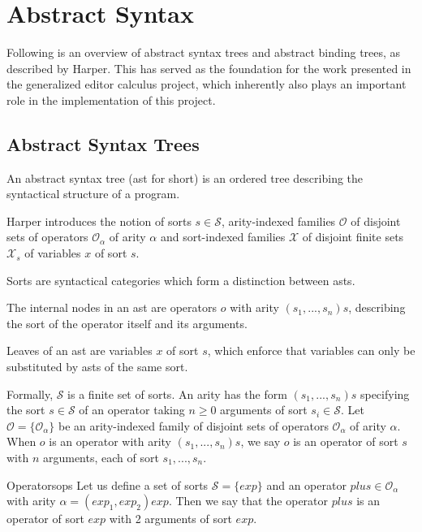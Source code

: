 \section{Abstract Syntax}
Following is an overview of abstract syntax trees and abstract binding trees, as described by Harper\cite{harper}. This has served as the foundation for the work presented in
the generalized editor calculus project\cite{aalborg}, which inherently 
also plays an important role in the implementation of this project.


\subsection{Abstract Syntax Trees}
An abstract syntax tree (ast for short) is an ordered tree describing the syntactical structure of a program.

Harper introduces the notion of sorts $s \in \mathcal{S}$, arity-indexed families $\mathcal{O}$ of disjoint sets of operators $\mathcal{O}_\alpha$ of arity $\alpha$ and sort-indexed families $\mathcal{X}$ of disjoint finite sets $\mathcal{X}_s$ of variables $x$ of sort $s$.

Sorts are syntactical categories which form a distinction between asts.

The internal nodes in an ast are operators $o$ with arity $(s_1,...,s_n)s$, describing the sort of the operator itself and its arguments.

Leaves of an ast are variables $x$ of sort $s$, which enforce that variables can only be substituted by asts of the same sort.

Formally,  $\mathcal{S}$ is a finite set of sorts. An arity has the form $(s_1,...,s_n)s$ specifying the sort $s \in \mathcal{S}$ of an operator taking $n \geq 0$ arguments of sort $s_i \in \mathcal{S}$. Let $\mathcal{O} = \{ \mathcal{O}_\alpha \}$ be an arity-indexed family of disjoint sets of operators $\mathcal{O}_\alpha$ of arity $\alpha$. When $o$ is an operator with arity $(s_1,...,s_n)s$, we say $o$ is an operator of sort $s$ with $n$ arguments, each of sort $s_1,...,s_n$.

\begin{example}{Operators}{ops}
    Let us define a set of sorts $\mathcal{S} = \{ exp \}$ and an operator $plus \in \mathcal{O}_\alpha$ with arity $\alpha = (exp_1,exp_2)exp$. Then we say that the operator $plus$ is an operator of sort $exp$ with 2 arguments of sort $exp$.
\end{example}

